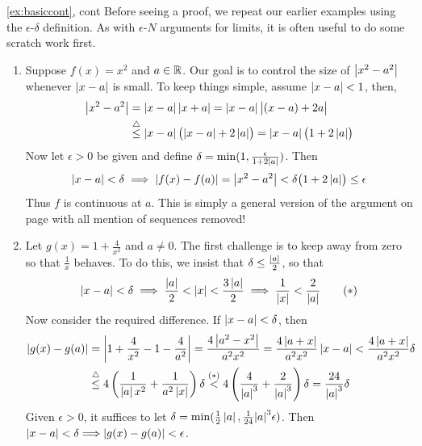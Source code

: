 \begin{examples*}{\ref{ex:basiccont}, cont}{}
	Before seeing a proof, we repeat our earlier examples using the $\epsilon$-$\delta$ definition. As with $\epsilon$-$N$ arguments for limits, it is often useful to do some scratch work first.

	\begin{enumerate}
  	\item Suppose $f(x)= x^2$ and $a\in\mathbb{R}$. Our goal is to control the size of $\left| x^2-a^2\right|$ whenever $\left| x-a\right|$ is small. To keep things simple, assume $\left| x-a\right|<1$, then,
  	\begin{align*}
  		\left| x^2-a^2\right|
  		&=\left| x-a\right|\left| x+a\right| =\left| x-a\right|\bigl|(x-a)+2a\bigr|\\
  		&\overset{\triangle}{\le}
  			\left| x-a\right|\bigl(\left| x-a\right|+2\left| a\right|\bigr) 
  			=\left| x-a\right|\bigl(1+2\left| a\right|\bigr)
  	\end{align*}
 		Now let $\epsilon>0$ be given and define $\delta=\min(1,\frac\epsilon{1+2\left| a\right|})$. Then
  	\[
	  	\left| x-a\right|<\delta \implies\left| f(x)-f(a)\right|
	  	=\left| x^2-a^2\right| <\delta\bigl(1+2\left| a\right|\bigr)
	  	\le\epsilon
  	\]
  	Thus $f$ is continuous at $a$. This is simply a general version of the argument on page \pageref{ex:easycont2} with all mention of sequences removed!
  
  	\goodbreak
  
  	\item Let $g(x)=1+\frac 4{x^2}$ and $a\neq 0$. The first challenge is to keep away from zero so that $\frac 1x$ behaves. To do this, we insist that $\delta\le\frac{\left| a\right|}2$, so that
  	\[
  		\left| x-a\right|<\delta\implies \frac{\left| a\right|}2<\left| x\right|<\frac{3\left| a\right|}2 \implies \frac 1{\left| x\right|}<\frac 2{\left| a\right|}\tag{$\ast$}
  	\]
  	Now consider the required difference. If $\left| x-a\right|<\delta$, then
	  \begin{align*}
			\left| g(x)-g(a)\right| 
			&=\left| 1+\frac 4{x^2}-1-\frac 4{a^2}\right|
				=\frac{4\left| a^2-x^2\right|}{a^2x^2}
				=\frac{4\left| a+x\right|}{a^2x^2}\left| x-a\right|
				<\frac{4\left| a+x\right|}{a^2x^2}\delta\\
	  	&\overset{\triangle}{\le} 4\left(\frac 1{\left| a\right|x^2}+\frac 1{a^2\left| x\right|}\right)\delta
	  		\overset{(\ast)}{<} 4\left(\frac 4{\left| a\right|^3}+\frac 2{\left| a\right|^3}\right)\delta 
	  		=\frac{24}{\left| a\right|^3}\delta
  	\end{align*}
 		Given $\epsilon>0$, it suffices to let $\delta=\min(\frac 12\left| a\right|,\frac 1{24}{\left| a\right|^3}\epsilon)$. Then $\left| x-a\right|<\delta\Longrightarrow\left| g(x)-g(a)\right| <\epsilon$.
  

\end{enumerate}
\end{examples*}
